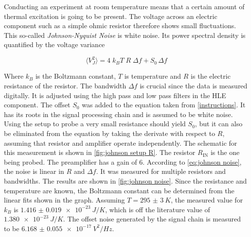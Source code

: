 \documentclass[
    parskip=half, 
    twoside=false,
    twocolumn=true,
    fontsize=11pt,
]{scrarticle}
\begin{document}
Conducting an experiment at room temperature means that a certain amount of thermal excitation is going to be present. The voltage across an electric component such as a simple ohmic resistor therefore shows small fluctuations. This so-called \textit{Johnson-Nyquist Noise} is white noise. Its power spectral density is quantified by the voltage variance

\begin{equation}
    \label{eq:johnson noise}
    \langle V_J^2 \rangle = 4\; k_B T\; R\; \Delta f + S_0\, \Delta f
\end{equation} 

Where $k_B$ is the Boltzmann constant, $T$ is temperature and $R$ is the electric resistance of the resistor. The bandwidth $\Delta f$ is crucial since the data is measured digitally. It is adjusted using the high pass and low pass filters in the HLE component. The offset $S_0$ was added to the equation taken from \autoref{instructions}. It has its roots in the signal processing chain and is assumed to be white noise. Using the setup to probe a very small resistance should yield $S_0$, but it can also be eliminated from the equation by taking the derivate with respect to $R$, assuming that resistor and amplifier operate independently. The schematic for this measurement is shown in \autoref{fig:johnson setup R}. The resistor $R_\text{IN}$ is the one being probed. The preamplifier has a gain of $6$.  According to \autoref{eq:johnson noise}, the noise is linear in $R$ and $\Delta f$. It was measured for multiple resistors and bandwidths. The results are shown in \autoref{fig:johnson noise}. Since the resistance and temperature are known, the Boltzmann constant can be determined from the linear fits shown in the graph. Assuming $T=\SI{295(3)}{K}$, the measured value for $k_B$ is $\SI{1.416(19)e-23}{J/K}$, which is off the literature value of $\SI{1.380e-23}{J/K}$. The offset noise generated by the signal chain is measured to be $\SI{6.168(55)e-17}{V^2/Hz}$.
\end{document}
